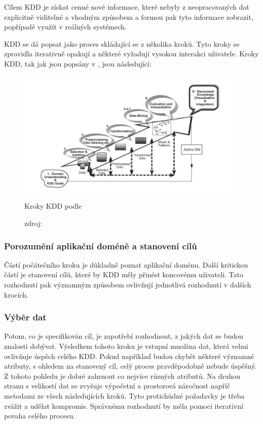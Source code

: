 \documentclass[thesis=M,czech]{FITthesis}[2012/06/26]
\begin{document}
Cílem KDD je získat cenné nové informace, které nebyly z neopracovaných dat explicitně viditelné a vhodným způsobem a formou pak tyto informace zobrazit, popřípadě využít v reálných systémech.\cite{fayyad}

KDD se dá popsat jako proces skládající se z několika kroků. Tyto kroky se zpravidla iterativně opakují a některé vyžadují vysokou interakci uživatele. Kroky KDD, tak jak jsou popsány v \cite{hbcap}, jsou následující:

\begin{figure}[htbp]
\begin{center}
	\includegraphics[scale=0.75]{kdd_steps}
\caption{Kroky KDD podle \cite{fayyad}}
\end{center}
  \caption*{zdroj: \cite{fayyad}}
\end{figure}

\subsubsection*{Porozumění aplikační doméně a stanovení cílů}
Částí počátečního kroku je důkladně poznat aplikační doménu. Další kritickou částí je stanovení cílů, které by KDD měly přinést koncovému uživateli. Tato rozhodnutí pak významným způsobem ovlivňují jednotlivá rozhodnutí v dalších krocích.
 		
\subsubsection*{Výběr dat}
Potom, co je specifikován cíl, je zapotřebí rozhodnout, z jakých dat se budou znalosti dobývat. 
Výsledkem tohoto kroku je vstupní množina dat, která velmi ovlivňuje úspěch celého KDD. Pokud například budou chybět některé významné atributy, s ohledem na stanovený cíl, celý proces pravděpodobně nebude úspěšný. Z tohoto pohledu je dobré zahrnout co nejvíce různých atributů. Na druhou stranu s velikostí dat se zvyšuje výpočetní a prostorová náročnost napříč metodami ze všech následujících kroků. Tyto protichůdné požadavky je třeba zvážit a udělat kompromis. Správnému rozhodnutí by měla pomoci iterativní povaha celého procesu.
\end{document}
